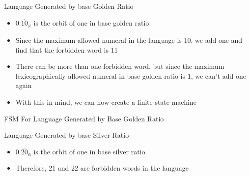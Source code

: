 \documentclass{beamer}
\begin{document}
\begin{frame}{Language Generated by base Golden Ratio}
  \begin{itemize}
    \item $0.\overline{10}_\varphi$ is the orbit of one in base golden ratio \pause
    \item Since the maximum allowed numeral in the language is 10, we add one and find that the forbidden word is 11 \pause
    \item There can be more than one forbidden word, but since the maximum lexicographically allowed numeral in base golden ratio is 1, we can't add one again \pause
    \item With this in mind, we can now create a finite state machine
  \end{itemize}
\end{frame}

\begin{frame}{FSM For Language Generated by Base Golden Ratio}
  \begin{center}
  \end{center}
\end{frame}

\begin{frame}{Language Generated by base Silver Ratio}
  \begin{itemize}
    \item $0.\overline{20}_\alpha$ is the orbit of one in base silver ratio \pause
    \item Therefore, 21 and 22 are forbidden words in the language
  \end{itemize}
\end{frame}
\end{document}
